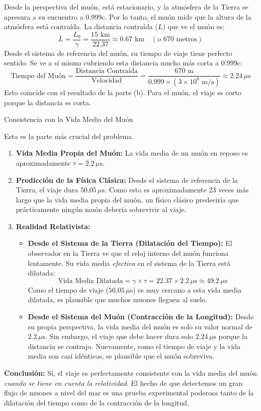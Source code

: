 \documentclass[11pt,a4paper]{book}
\begin{document}
\begin{enumerate}
\begin{itemize}
Desde la perspectiva del muón, está estacionario, y la atmósfera de la Tierra se apresura a su encuentro a 0.999c. Por lo tanto, el muón mide que la altura de la atmósfera está contraída. La distancia contraída ($L$) que ve el muón es:
\[ L = \frac{L_0}{\gamma} = \frac{15 \text{ km}}{22.37} \approx 0.67 \text{ km} \quad (\text{o 670 metros}) \]
Desde el sistema de referencia del muón, su tiempo de viaje tiene perfecto sentido. Se ve a sí mismo cubriendo esta distancia mucho más corta a 0.999c:
\[ \text{Tiempo del Muón} = \frac{\text{Distancia Contraída}}{\text{Velocidad}} = \frac{670 \text{ m}}{0.999 \times (3 \times 10^8 \text{ m/s})} \approx 2.24 \, \mu\text{s} \]
Esto coincide con el resultado de la parte (b). Para el muón, el viaje es corto porque la distancia es corta.

\textbf{}{Consistencia con la Vida Media del Muón}

Esta es la parte más crucial del problema.
\begin{enumerate}
    \item \textbf{Vida Media Propia del Muón:} La vida media de un muón en reposo es aproximadamente $\tau = 2.2 \, \mu\text{s}$.

    \item \textbf{Predicción de la Física Clásica:} Desde el sistema de referencia de la Tierra, el viaje dura $50.05 \, \mu\text{s}$. Como esto es aproximadamente 23 veces más largo que la vida media propia del muón, un físico clásico predeciría que prácticamente ningún muón debería sobrevivir al viaje.

    \item \textbf{Realidad Relativista:}
    \begin{itemize}
        \item \textbf{Desde el Sistema de la Tierra (Dilatación del Tiempo):} El observador en la Tierra ve que el reloj interno del muón funciona lentamente. Su vida media \textit{efectiva} en el sistema de la Tierra está dilatada:
        \[ \text{Vida Media Dilatada} = \gamma \times \tau = 22.37 \times 2.2 \, \mu\text{s} \approx 49.2 \, \mu\text{s} \]
        Como el tiempo de viaje ($50.05 \, \mu\text{s}$) es muy cercano a esta vida media dilatada, es plausible que muchos muones lleguen al suelo.
        \item \textbf{Desde el Sistema del Muón (Contracción de la Longitud):} Desde su propia perspectiva, la vida media del muón es solo su valor normal de $2.2 \, \mu\text{s}$. Sin embargo, el viaje que debe hacer dura solo $2.24 \, \mu\text{s}$ porque la distancia se contrajo. Nuevamente, como el tiempo de viaje y la vida media son casi idénticos, es plausible que el muón sobreviva.
    \end{itemize}
\end{enumerate}
\textbf{Conclusión:} Sí, el viaje es perfectamente consistente con la vida media del muón \textit{cuando se tiene en cuenta la relatividad}. El hecho de que detectemos un gran flujo de muones a nivel del mar es una prueba experimental poderosa tanto de la dilatación del tiempo como de la contracción de la longitud.
\end{itemize}



\end{enumerate}
\end{document}
